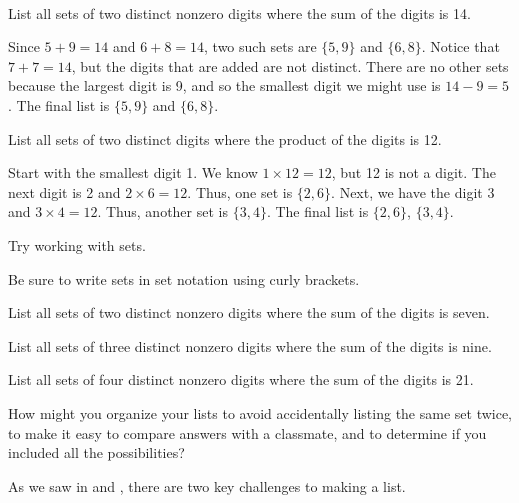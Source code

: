 \begin{exam}
\label{exam_two_digit_sets}
~
    \begin{apart}
        \item List all sets of two distinct nonzero digits where the sum of the digits is 14.      
        \begin{soln}
             Since $5+9=14$ and $6+8=14$, two such sets are $\{5,9\}$ and $\{6,8\}$.  Notice that $7+7=14$, but the digits that are added are not distinct. There are no other sets because the largest digit is 9, and so the smallest digit we might use is $14-9=5$.  The final list is $\{5,9\}$ and $\{6,8\}$.
        \end{soln}  
        \item List all sets of two distinct digits where the product of the digits is 12.
        \begin{soln}
            Start with the smallest digit 1.  We know $1 \times 12 = 12$, but 12 is not a digit.  The next digit is 2 and $2 \times 6 = 12$.  Thus, one set is $\{2,6\}$.  Next, we have the digit 3 and $3 \times 4 = 12$. Thus, another set is $\{3,4\}$.  The final list is $\{2,6\}$, $\{3,4\}$. 
        \end{soln}
    \end{apart}
\end{exam}

Try working with sets.

\begin{act} 
\label{act_digit_sum}
    Be sure to write sets in set notation using curly brackets.
    
    \begin{actpart}
        \item List all sets of two distinct nonzero digits where the sum of the digits is seven.    
        \item \label{part_3sum_is9} List all sets of three distinct nonzero digits where the sum of the digits is nine.   
        \item List all sets of four distinct nonzero digits where the sum of the digits is 21.  
        \item How might you organize your lists to avoid accidentally listing the same set twice, to make it easy to compare answers with a classmate, and to determine if you included all the possibilities?
    \end{actpart}    
\end{act}

As we saw in  and , there are two key challenges to making a list.

